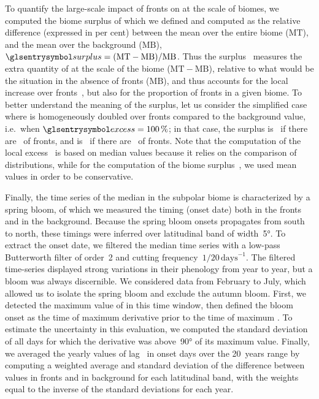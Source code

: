To quantify the large-scale impact of fronts on  at the scale of biomes, we computed the biome surplus of  which we defined and computed as the relative difference (expressed in per cent) between the mean  over the entire biome (\(\mathrm{MT}\)), and the mean  over the background (\(\mathrm{MB}\)), \(\am{surplus} = (\mathrm{MT}-\mathrm{MB}) / \mathrm{MB}\).
Thus the surplus~ measures the extra quantity of  at the scale of the biome (\(\mathrm{MT} - \mathrm{MB}\)), relative to what would be the situation in the absence of fronts (\(\mathrm{MB}\)), and thus accounts for the local increase over fronts~, but also for the proportion of fronts in a given biome.
To better understand the meaning of the surplus, let us consider the simplified case where  is homogeneously doubled over fronts compared to the background value, i.e.\ when \(\am{excess} =\pct{100}\); in that case, the surplus  is~ if there are~ of fronts, and is~ if there are~ of fronts.
Note that the computation of the local excess~ is based on median values because it relies on the comparison of distributions, while for the computation of the biome surplus~, we used mean values in order to be conservative.

Finally, the time series of the  median in the subpolar biome is characterized by a spring bloom, of which we measured the timing (onset date) both in the fronts and in the background.
Because the spring bloom onsets propagates from south to north, these timings were inferred over latitudinal band of width~\ang{5}.
To extract the onset date, we filtered the  median time series with a low-pass Butterworth filter of order~2 and cutting frequency~\(1/20\,\textrm{days}^{-1}\).
The filtered time-series displayed strong variations in their phenology from year to year, but a bloom was always discernible.
We considered data from February to July, which allowed us to isolate the spring bloom and exclude the autumn bloom.
First, we detected the maximum value of  in this time window, then defined the bloom onset as the time of maximum  derivative prior to the time of maximum .
To estimate the uncertainty in this evaluation, we computed the standard deviation of all days for which the  derivative was above~\ang{90} of its maximum value.
Finally, we averaged the yearly values of lag~ in onset days over the 20~years range by computing a weighted average and standard deviation of the difference between values in fronts and in background for each latitudinal band, with the weights equal to the inverse of the standard deviations for each year.

